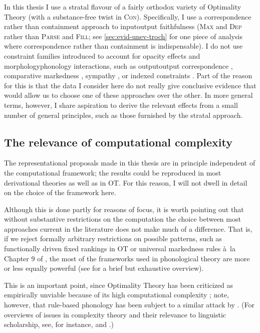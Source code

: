 In this thesis I use a stratal flavour of a fairly orthodox variety of Optimality Theory (with a substance\hyp free twist in \textsc{Con}). Specifically, I use a correspondence rather than containment approach to input\endash output faithfulness (\ie \textsc{Max} and \textsc{Dep} rather than \textsc{Parse} and \textsc{Fill}; see \cref{sec:evid-unev-troch} for one piece of analysis where correspondence rather than containment is indispensable). I do not use constraint families introduced to account for opacity effects and morphology\endash phonology interactions, such as output\endash output correspondence \citep[\egm][]{benua97:_trans}, comparative markedness \citep[\egm][]{compmark}, sympathy \citep[\egm][]{mccarthy-doy}, or indexed constraints \citep[\egm][]{fukazawa97:_japan,pater00:_non_englis,pater09:_morph}. Part of the reason for this is that the data I consider here do not really give conclusive evidence that would allow us to choose one of these approaches over the other. In more general terms, however, I share  aspiration to derive the relevant effects from a small number of general principles, such as those furnished by the stratal approach.

\subsection{The relevance of computational complexity}
\label{sec:choice-approach}

The representational proposals made in this thesis are in principle independent of the computational framework; the results could be reproduced in most derivational theories as well as in OT. For this reason, I will not dwell in detail on the choice of the framework here.

Although this is done partly for reasons of focus, it is worth pointing out that without substantive restrictions on the computation the choice between most approaches current in the literature does not make much of a difference. That is, if we reject formally arbitrary restrictions on possible patterns, such as functionally driven fixed rankings in OT or universal markedness rules à~la Chapter 9 of \citet{spe}, the most of the frameworks used in phonological theory are more or less equally powerful (see \citealt{Heinz-2011-CPF,Heinz-2011-CPGLF} for a brief but exhaustive overview).

This is an important point, since Optimality Theory has been criticized as empirically unviable because of its high computational complexity \citep[\eg by][]{vaux:_why}; note, however, that rule\hyp based phonology has been subject to a similar attack by \citet{coleman98:_phonol}. (For overviews of issues in complexity theory and their relevance to linguistic scholarship, see, for instance, \citealt[§3.5.5]{fitch10} and \citealt{heinz11:_senten_word_compl}.)

